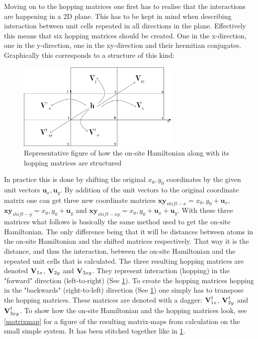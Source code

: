 Moving on to the hopping matrices one first has to realise that the interactions are happening in a 2D plane. This has to be kept in mind when describing interaction between unit cells repeated in all directions in the plane. Effectively this means that six hopping matrices should be created. One in the x-direction, one in the y-direction, one in the xy-direction and their hermitian conjugates. Graphically this corresponds to a structure of this kind:
\begin{figure}[H]
	\centering
	\includegraphics[width = 0.7\textwidth]{Figures/repfig.eps}
	\caption{Representative figure of how the on-site Hamiltonian along with its hopping matrices are structured}
	\label{repfig}
\end{figure}
In practice this is done by shifting the original \(x_0,y_0\) coordinates by the given unit vectors \(\mathbf{u}_x,\mathbf{u}_y\). By addition of the unit vectors to the original coordinate matrix one can get three new coordinate matrices \(\mathbf{xy}_{shift-x}=x_0,y_0 + \mathbf{u}_x\), \(\mathbf{xy}_{shift-y}=x_0,y_0 + \mathbf{u}_y\) and \(\mathbf{xy}_{shift-xy}=x_0,y_0 + \mathbf{u}_x+\mathbf{u}_y\). With these three matrices what follows is basically the same method used to get the on-site Hamiltonian. The only difference being that it will be distances between atoms in the on-site Hamiltonian and the shifted matrices respectively. That way it is the distance, and thus the interaction, between the on-site Hamiltonian and the repeated unit cells that is calculated. The three resulting hopping matrices are denoted \(\vb{V}_{1x}\), \(\vb{V}_{2y}\) and \(\vb{V}_{3xy}\). They represent interaction (hopping) in the "forward" direction (left-to-right) (See \cref{repfig}). To create the hopping matrices hopping in the "backwards" (right-to-left) direction (See \cref{repfig}) one simply has to transpose the hopping matrices. These matrices are denoted with a dagger: \(\vb{V}_{1x}^{\dagger}\), \(\vb{V}_{2y}^{\dagger}\) and \(\vb{V}_{3xy}^{\dagger}\). To show how the on-site Hamiltonian and the hopping matrices look, see \cref{matrixmap} for a figure of the resulting matrix-maps from calculation on the small simple system. It has been stitched together like in \cref{repfig}.
